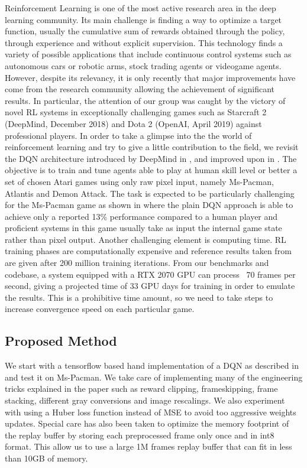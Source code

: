 \documentclass[10pt,twocolumn,letterpaper]{article}
\begin{document}
Reinforcement Learning is one of the most active research area in the deep learning community. Its main challenge is finding a way to optimize a target function, usually the cumulative sum of rewards obtained through the policy, through experience and without explicit supervision. This technology finds a variety of possible applications that include continuous control systems such as autonomous cars or robotic arms, stock trading agents or videogame agents. However, despite its relevancy, it is only recently that major improvements have come from the research community allowing the achievement of significant results.
In particular, the attention of our group was caught by the victory of novel RL systems in exceptionally challenging games such as Starcraft 2 (DeepMind, December 2018) and Dota 2 (OpenAI, April 2019) against professional players. In order to take a glimpse into the the world of reinforcement learning and try to give a little contribution to the field, we revisit the DQN architecture introduced by DeepMind in \cite{DBLP:journals/corr/MnihKSGAWR13}, and improved upon in \cite{DBLP:journals/corr/abs-1710-02298}. The objective is to train and tune agents able to play at human skill level or better a set of chosen Atari games using only raw pixel input, namely Ms-Pacman, Atlantis and Demon Attack. The task is expected to be particularly challenging for the Ms-Pacman game as shown in \cite{humancontrol} where the plain DQN approach is able to achieve only a reported 13\% performance compared to a human player and proficient systems in this game usually take as input the internal game state rather than pixel output.
Another challenging element is computing time. RL training phases are computationally expensive and reference results taken from \cite{DBLP:journals/corr/abs-1710-02298} are given after 200 million training iterations. From our benchmarks and codebase, a system equipped with a RTX 2070 GPU can process ~70 frames per second, giving a projected time of 33 GPU days for training in order to emulate the results. This is a prohibitive time amount, so we need to take steps to increase convergence speed on each particular game.


\subsection{Proposed Method}

We start with a tensorflow based hand implementation of a DQN as described in \cite{DBLP:journals/corr/MnihKSGAWR13} and test it on Ms-Pacman. We take care of implementing many of the engineering tricks explained in the paper such as reward clipping, frameskipping, frame stacking, different gray conversions and image rescalings. We also experiment with using a Huber loss function instead of MSE to avoid too aggressive weights updates. Special care has also been taken to optimize the memory footprint of the replay buffer by storing each preprocessed frame only once and in int8 format. This allow us to use a large 1M frames replay buffer that can fit in less than 10GB of memory.
\end{document}
